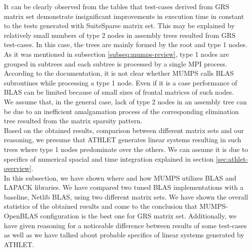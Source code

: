 It can be clearly observed from the tables that test-cases derived from GRS matrix set demonstrate insignificant improvements in execution time in constant to the tests generated with SuiteSparse matrix set. This may be explained by relatively small numbers of type 2 nodes in assembly trees resulted from GRS test-cases. In this case, the trees are mainly formed by the root and type 1 nodes. As it was mentioned in subsection \ref{subseq:mumps-review}, type 1 nodes are grouped in subtrees and each subtree is processed by a single MPI process. According to the documentation, it is not clear whether MUMPS calls BLAS subroutines while processing a type 1 node. Even if it is a case performance of BLAS can be limited because of small sizes of frontal matrices of such nodes.\\

We assume that, in the general case, lack of type 2 nodes in an assembly tree can be due to an inefficient amalgamation process of the corresponding elimination tree resulted from the matrix sparsity pattern.\\


Based on the obtained results, comparison between different matrix sets and our reasoning, we presume that ATHLET generates linear systems resulting in such trees where type 1 nodes predominate over the others. We can assume it is due to specifics of numerical spacial and time integration explained in section \ref{sec:athlet-overview}.\\


In this subsection, we have shown where and how MUMPS utilizes BLAS and LAPACK libraries. We have compared two tuned BLAS implementations with a baseline, Netlib BLAS, using two different matrix sets. We have shown the overall statistics of the obtained results and come to the conclusion that MUMPS-OpenBLAS configuration is the best one for GRS matrix set. Additionally, we have given reasoning for a noticeable difference between results of some test-cases as well as we have talked about probable specifics of linear systems generated by ATHLET.\\